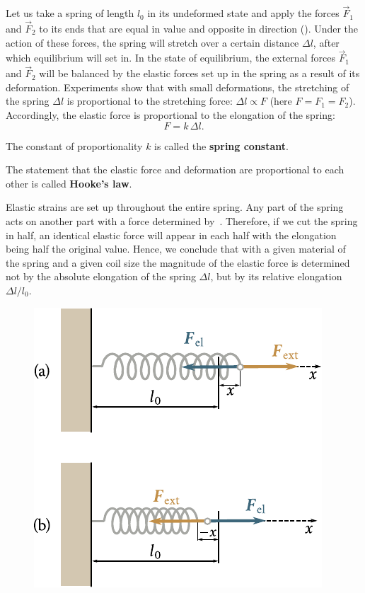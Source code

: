 Let us take a spring of length $l_0$ in its undeformed state and apply the forces $\vec{F}_1$ and $\vec{F}_2$ to its ends that are equal in value and opposite in direction (). Under the action of these forces, the spring will stretch over a certain distance $\Delta l$, after which equilibrium will set in. In the state of equilibrium, the external forces $\vec{F}_1$ and $\vec{F}_2$ will be balanced by the elastic forces set up in the spring as a result of its deformation. Experiments show that with small deformations, the stretching of the spring $\Delta l$ is proportional to the stretching force: $\Delta l\propto F$ (here $F=F_1=F_2$). Accordingly, the elastic force is proportional to the elongation of the spring:
\begin{equation}\label{eq:2_25}
F = k\,\Delta l.
\end{equation}

\noindent
The constant of proportionality $k$ is called the \textbf{spring constant}.

The statement that the elastic force and deformation are proportional to each other is called \textbf{Hooke's law}.

Elastic strains are set up throughout the entire spring. Any part of the spring acts on another part with a force determined by~. Therefore, if we cut the spring in half, an identical elastic force will appear in each half with the elongation being half the original value. Hence, we conclude that with a given material of the spring and a given coil size the magnitude of the elastic force is determined not by the absolute elongation of the spring $\Delta l$, but by its relative elongation $\Delta l/l_0$.

\begin{figure}[t]
	\begin{center}
		\includegraphics[scale=0.95]{figures/ch_02/fig_2_5.pdf}
		\caption[]{}
		\label{fig:2_5}
	\end{center}
	\vspace{-0.7cm}
\end{figure}

